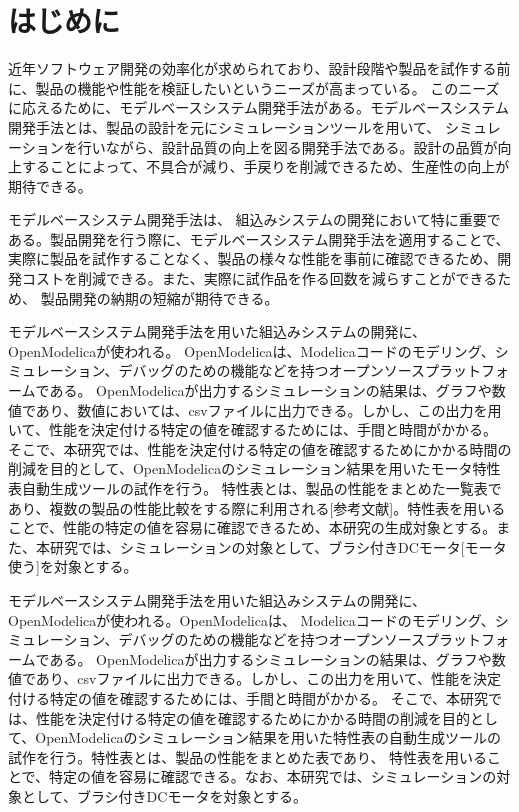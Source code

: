 \chapter{はじめに}\label{cha:Introduction}
近年ソフトウェア開発の効率化が求められており、設計段階や製品を試作する前に、製品の機能や性能を検証したいというニーズが高まっている\cite{modelicaモデルベース本}。
このニーズに応えるために、モデルベースシステム開発手法がある\cite{modelicaモデルベース本}。モデルベースシステム開発手法とは、製品の設計を元にシミュレーションツールを用いて、
シミュレーションを行いながら、設計品質の向上を図る開発手法である\cite{ipa_2016}。設計の品質が向上することによって、不具合が減り、手戻りを削減できるため、生産性の向上が期待できる\cite{ipa_2016}。

モデルベースシステム開発手法は、 組込みシステムの開発において特に重要である\cite{ipa_useful_modelbase_dev}。製品開発を行う際に、モデルベースシステム開発手法を適用することで、
実際に製品を試作することなく、製品の様々な性能を事前に確認できるため、開発コストを削減できる\cite{modelicaモデルベース本}。また、実際に試作品を作る回数を減らすことができるため、
製品開発の納期の短縮が期待できる。

モデルベースシステム開発手法を用いた組込みシステムの開発に、OpenModelica\cite{open_modelica}が使われる。
OpenModelicaは、Modelica\cite{modelicaモデルベース本}コードのモデリング、シミュレーション、デバッグのための機能などを持つオープンソースプラットフォームである。
OpenModelicaが出力するシミュレーションの結果は、グラフや数値であり、数値においては、csvファイルに出力できる。しかし、この出力を用いて、性能を決定付ける特定の値を確認するためには、手間と時間がかかる。
そこで、本研究では、性能を決定付ける特定の値を確認するためにかかる時間の削減を目的として、OpenModelicaのシミュレーション結果を用いたモータ特性表自動生成ツールの試作を行う。
特性表とは、製品の性能をまとめた一覧表であり、複数の製品の性能比較をする際に利用される[参考文献]。特性表を用いることで、性能の特定の値を容易に確認できるため、本研究の生成対象とする。また、本研究では、シミュレーションの対象として、ブラシ付きDCモータ[モータ使う]を対象とする。


モデルベースシステム開発手法を用いた組込みシステムの開発に、OpenModelica\cite{open_modelica}が使われる。OpenModelicaは、
Modelica\cite{modelicaモデルベース本}コードのモデリング、シミュレーション、デバッグのための機能などを持つオープンソースプラットフォームである。
OpenModelicaが出力するシミュレーションの結果は、グラフや数値であり、csvファイルに出力できる。しかし、この出力を用いて、性能を決定付ける特定の値を確認するためには、手間と時間がかかる。
そこで、本研究では、性能を決定付ける特定の値を確認するためにかかる時間の削減を目的として、OpenModelicaのシミュレーション結果を用いた特性表の自動生成ツールの試作を行う。特性表とは、製品の性能をまとめた表であり、
特性表を用いることで、特定の値を容易に確認できる。なお、本研究では、シミュレーションの対象として、ブラシ付きDCモータ\cite{モータ使う}を対象とする。


